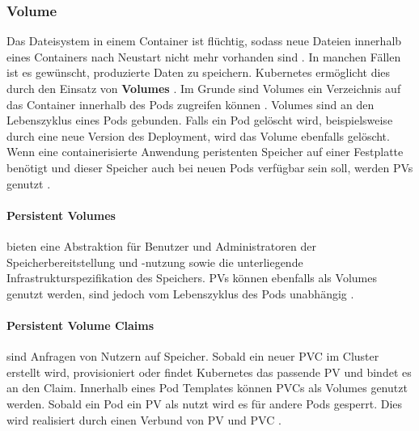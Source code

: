 \subsubsection{Volume}
\label{subsec:kubernetes:volume}
Das Dateisystem in einem Container ist flüchtig, 
sodass neue Dateien innerhalb eines Containers nach Neustart nicht mehr vorhanden sind \cite{kubernetesVolumes}.
In manchen Fällen ist es gewünscht, produzierte Daten zu speichern.
Kubernetes ermöglicht dies durch den Einsatz von \textbf{Volumes} \cite{Marko2018}.
Im Grunde sind Volumes ein Verzeichnis auf das Container innerhalb des Pods zugreifen können \cite{kubernetesVolumes}.
Volumes sind an den Lebenszyklus eines Pods gebunden. Falls ein Pod gelöscht wird, beispielsweise durch eine neue Version des Deployment,
wird das Volume ebenfalls gelöscht.
Wenn eine containerisierte Anwendung peristenten Speicher auf einer Festplatte benötigt und dieser Speicher auch bei neuen Pods verfügbar sein soll,
werden \acfp{PV} genutzt \cite{Marko2018}.

\paragraph{Persistent Volumes}
bieten eine Abstraktion für Benutzer und Administratoren der Speicherbereitstellung und -nutzung sowie
die unterliegende Infrastrukturspezifikation des Speichers.
\acp{PV} können ebenfalls als Volumes genutzt werden,
sind jedoch vom Lebenszyklus des Pods unabhängig \cite{kubernetesPV}.

\paragraph{Persistent Volume Claims}
sind Anfragen von Nutzern auf Speicher. 
Sobald ein neuer \ac{PVC} im Cluster erstellt wird, provisioniert oder findet Kubernetes das
passende \ac{PV} und bindet es an den Claim.
Innerhalb eines Pod Templates können \acp{PVC} als Volumes genutzt werden.
Sobald ein Pod ein \ac{PV} als nutzt wird es für andere Pods gesperrt. 
Dies wird realisiert durch einen Verbund von \ac{PV} und \ac{PVC} \cite{Marko2018}.
